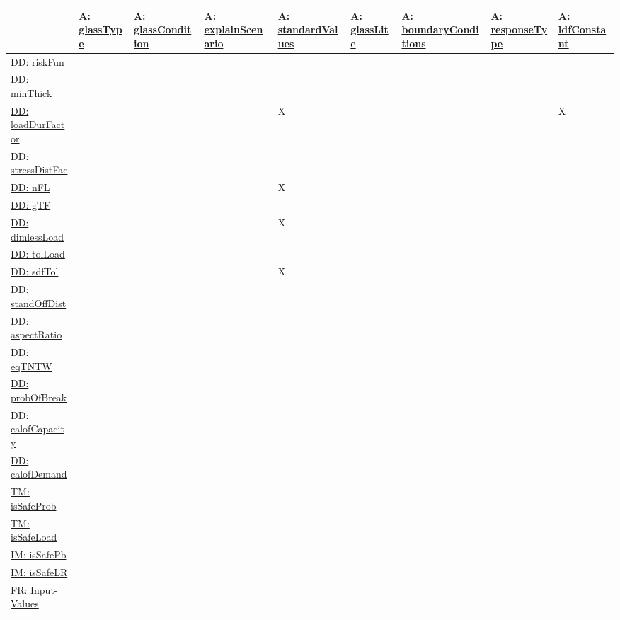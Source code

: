 \documentclass[12pt]{article}
\begin{document}
\begin{longtable}{l l l l l l l l l}
\toprule
\textbf{} & \textbf{\hyperref[assumpGT]{A: glassType}} & \textbf{\hyperref[assumpGC]{A: glassCondition}} & \textbf{\hyperref[assumpES]{A: explainScenario}} & \textbf{\hyperref[assumpSV]{A: standardValues}} & \textbf{\hyperref[assumpGL]{A: glassLite}} & \textbf{\hyperref[assumpBC]{A: boundaryConditions}} & \textbf{\hyperref[assumpRT]{A: responseType}} & \textbf{\hyperref[assumpLDFC]{A: ldfConstant}}
\\
\midrule
\endhead
\hyperref[DD:riskFun]{DD: riskFun} &  &  &  &  &  &  &  & 
\\
\hyperref[DD:minThick]{DD: minThick} &  &  &  &  &  &  &  & 
\\
\hyperref[DD:loadDurFactor]{DD: loadDurFactor} &  &  &  & X &  &  &  & X
\\
\hyperref[DD:stressDistFac]{DD: stressDistFac} &  &  &  &  &  &  &  & 
\\
\hyperref[DD:nFL]{DD: nFL} &  &  &  & X &  &  &  & 
\\
\hyperref[DD:gTF]{DD: gTF} &  &  &  &  &  &  &  & 
\\
\hyperref[DD:dimlessLoad]{DD: dimlessLoad} &  &  &  & X &  &  &  & 
\\
\hyperref[DD:tolLoad]{DD: tolLoad} &  &  &  &  &  &  &  & 
\\
\hyperref[DD:sdfTol]{DD: sdfTol} &  &  &  & X &  &  &  & 
\\
\hyperref[DD:standOffDist]{DD: standOffDist} &  &  &  &  &  &  &  & 
\\
\hyperref[DD:aspectRatio]{DD: aspectRatio} &  &  &  &  &  &  &  & 
\\
\hyperref[DD:eqTNTW]{DD: eqTNTW} &  &  &  &  &  &  &  & 
\\
\hyperref[DD:probOfBreak]{DD: probOfBreak} &  &  &  &  &  &  &  & 
\\
\hyperref[DD:calofCapacity]{DD: calofCapacity} &  &  &  &  &  &  &  & 
\\
\hyperref[DD:calofDemand]{DD: calofDemand} &  &  &  &  &  &  &  & 
\\
\hyperref[TM:isSafeProb]{TM: isSafeProb} &  &  &  &  &  &  &  & 
\\
\hyperref[TM:isSafeLoad]{TM: isSafeLoad} &  &  &  &  &  &  &  & 
\\
\hyperref[IM:isSafePb]{IM: isSafePb} &  &  &  &  &  &  &  & 
\\
\hyperref[IM:isSafeLR]{IM: isSafeLR} &  &  &  &  &  &  &  & 
\\
\hyperref[inputValues]{FR: Input-Values} &  &  &  &  &  &  &  & 

\end{longtable}
\end{document}
